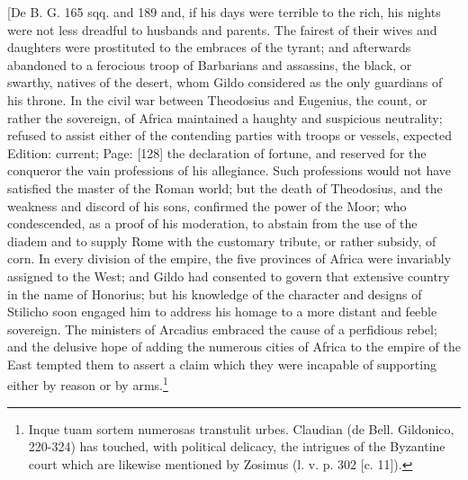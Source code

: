 {[De B. G. 165 sqq. and 189} and, if his days were terrible to the rich, his nights were not less dreadful to husbands and parents. The fairest of their wives and daughters were prostituted to the embraces of the tyrant; and afterwards abandoned to a ferocious troop of Barbarians and assassins, the black, or swarthy, natives of the desert, whom Gildo considered as the only guardians of his throne. In the civil war between Theodosius and Eugenius, the count, or rather the sovereign, of Africa maintained a haughty and suspicious neutrality; refused to assist either of the contending parties with troops or vessels, expected Edition: current; Page: [128] the declaration of fortune, and reserved for the conqueror the vain professions of his allegiance. Such professions would not have satisfied the master of the Roman world; but the death of Theodosius, and the weakness and discord of his sons, confirmed the power of the Moor; who condescended, as a proof of his moderation, to abstain from the use of the diadem and to supply Rome with the customary tribute, or rather subsidy, of corn. In every division of the empire, the five provinces of Africa were invariably assigned to the West; and Gildo had consented to govern that extensive country in the name of Honorius; but his knowledge of the character and designs of Stilicho soon engaged him to address his homage to a more distant and feeble sovereign. The ministers of Arcadius embraced the cause of a perfidious rebel; and the delusive hope of adding the numerous cities of Africa to the empire of the East tempted them to assert a claim which they were incapable of supporting either by reason or by arms.\footnote{Inque tuam sortem numerosas transtulit urbes. Claudian (de Bell. Gildonico, 220-324) has touched, with political delicacy, the intrigues of the Byzantine court which are likewise mentioned by Zosimus (l. v. p. 302 [c. 11]).}

